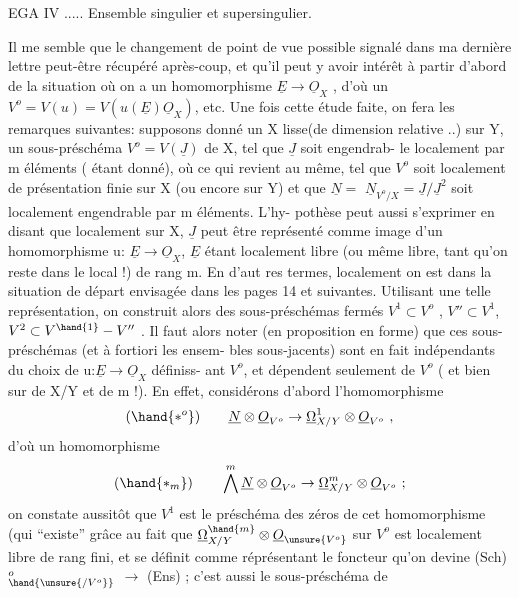 
EGA IV ..... Ensemble singulier et supersingulier.

Il me semble que le changement de point de vue possible signalé dans ma
dernière lettre peut-être récupéré après-coup, et qu'il peut y avoir intérêt
à partir d'abord de la situation où on a  un homomorphisme $\underline{E}\to\underline{O}_X$ , d'où
un $V^o = V(u) = V(u(\underline{E})\underline{O}_X)$, etc. Une fois cette étude faite, on fera les
remarques suivantes: supposons donné un X lisse(de dimension relative  ..)
sur Y, un sous-préschéma $V^o = V(\underline{J})$ de X, tel que $\underline{J}$  soit engendrab-%
le localement  par m éléments ( étant donné), où ce qui revient au
même, tel que $V^o$ soit localement de présentation finie sur X (ou encore sur
Y) et que $\underline{N} =$ $\underline{N}_{V^o/X} = \underline{J}/\underline{J}^2$  soit localement engendrable par m éléments.  L'hy-%
pothèse peut aussi s'exprimer en disant que localement sur X, $\underline{J}$ peut être
représenté comme image d'un homomorphisme  u: $\underline{E}\to\underline{O}_X$, $\underline{E}$ étant localement
libre (ou même libre, tant qu'on reste dans le local !) de rang m.  En d'aut
res termes, localement on est dans la situation de départ envisagée dans
les pages 14 et suivantes. Utilisant une telle représentation, on construit
alors des sous-préschémas fermés $V^1 \subset V^o$ , $V'' \subset V^1$, $V^2 \subset V^{\hand{1}}-V''$ . Il faut alors noter
(en proposition en forme) que ces sous-préschémas (et à fortiori les ensem-%
bles sous-jacents) sont en fait indépendants du choix de u:$\underline{E}\to\underline{O}_X$ définiss-%
ant $V^o$,  et dépendent seulement de  $V^o$ ( et bien sur de X/Y et de
m !).  En effet, considérons d'abord  l'homomorphisme
\[ (\hand{*^o}) \qquad \underline{N}\otimes\underline{O}_{V^o}\to\underline{\Omega}^1_{X/Y}\otimes\underline{O}_{V^o} \ , \]
d'où  un homomorphisme
\[ (\hand{*_m}) \qquad \bigwedge^m\underline{N}\otimes\underline{O}_{V^o}\to\underline{\Omega}^{m}_{X/Y}\otimes\underline{O}_{V^o}\ ; \]
on constate aussitôt que $V^1$ est le préschéma des zéros de cet homomorphisme
(qui ``existe'' grâce au fait que $\underline{\Omega}^{\hand{m}}_{X/Y}\otimes\underline{O}_{\unsure{V^o}}$  sur  $V^o$ est localement libre
de rang fini, et se définit comme réprésentant le foncteur qu'on devine
(Sch)$^o_{\hand{\unsure{/V^o}}}$ $\longrightarrow$ (Ens) ; c'est aussi le sous-préschéma de 

